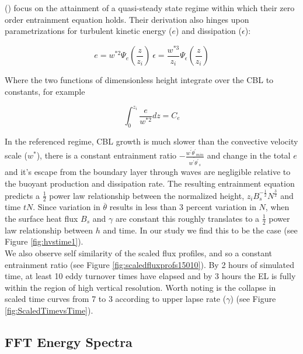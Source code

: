 \citeauthor{FedConzMir04} (\cite{FedConzMir04}) focus on the attainment of a quasi-steady
state regime within which their zero order entrainment equation holds.  Their derivation also hinges
upon parametrizations for turbulent kinetic energy ($e$) and dissipation ($\epsilon$):

\begin{equation}
e=w^{*2}\Psi_{e}\left( \frac{z}{z_{i}} \right) \ \epsilon=\frac{w^{*3}}{z_{i}}\Psi_{\epsilon}\left( \frac{z}{z_{i}}\right)
\end{equation}

Where the two functions of dimensionless height integrate over the \acs{CBL} to constants, for example

\begin{equation}
\int^{z_{i}}_{0}\frac{e}{w^{*2}}dz = C_{e}
\end{equation}

In the referenced regime, \acs{CBL} growth is much slower than the convective velocity scale ($w^{*}$),
there is a constant entrainment ratio $-\frac{\overline{w^{'}\theta^{'}}_{min}}{\overline{w^{'}\theta^{'}}_{s}}$
and change in the total $e$ and it's escape from the boundary layer through waves are negligible relative
to the buoyant production and dissipation rate.  The resulting entrainment equation predicts a $\frac{1}{2}$
power law relationship between the normalized height, $z_{i}B_{s}^{-\frac{1}{2}} N^{\frac{3}{2}}$ and time
$tN$.  Since variation in $\overline{\theta}$ results in
less than 3 percent variation in $N$, when the surface heat flux $B_{s}$ and $\gamma$ are constant
this roughly translates to a $\frac{1}{2}$ power law relationship between $h$ and time.  In our study we find this to be the case (see Figure \ref{fig:hvstime1}).\\
  
We also observe self similarity of the scaled flux profiles, and so a constant entrainment ratio (see Figure \ref{fig:scaledfluxprofs15010}). By 2 hours of simulated time, at least 10 eddy turnover times have elapsed and by 3 hours the \acs{EL} is fully within the region of high vertical resolution.  Worth noting is the collapse in scaled time curves from 7 to 3 according to upper lapse rate ($\gamma$) (see Figure \ref{fig:ScaledTimevsTime}).

\subsection{FFT Energy Spectra}
\FloatBarrier

